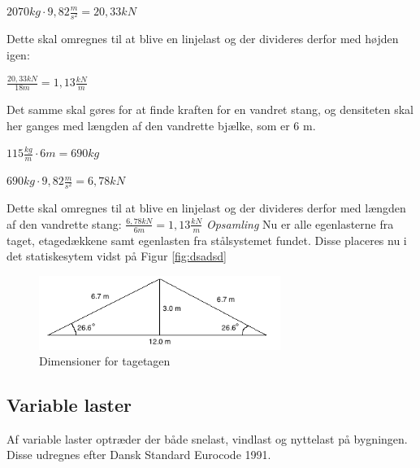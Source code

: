 \begin{center}
	$2070 kg \cdot 9,\!82\frac{m}{s^2} = 20,\! 33 kN$
\end{center}

Dette skal omregnes til at blive en linjelast og der divideres derfor med højden igen:

\begin{center}
$\frac{20,\! 33 kN}{18m} = 1,\! 13\frac{kN}{m}$
\end{center}

Det samme skal gøres for at finde kraften for en vandret stang, og densiteten skal her ganges med længden af den vandrette bjælke, som er 6 m.
\begin{center}
	$115\frac{kg}{m}\cdot 6m = 690 kg$
\end{center}

\begin{center}
	$690 kg \cdot 9,\!82\frac{m}{s^2} = 6,\!78  kN$
\end{center}

Dette skal omregnes til at blive en linjelast og der divideres derfor med længden af den vandrette stang:
$\frac{6,\! 78 kN}{6m} = 1,\! 13\frac{kN}{m}$
\newline
\newline
\textit{Opsamling}
\newline
Nu er alle egenlasterne fra taget, etagedækkene samt egenlasten fra stålsystemet fundet. Disse placeres nu i det statiskesytem vidst på Figur \ref{fig:dsadsd}

\begin{figure}[htbp]
	\centering
	\includegraphics[width=0.7\textwidth]{billeder/Tagmedvinkel.png}
	\caption{Dimensioner for tagetagen}
	\label{fig:tagetage}
\end{figure}

\subsection{Variable laster}
Af variable laster optræder der både snelast, vindlast og nyttelast på bygningen. Disse udregnes efter Dansk Standard Eurocode 1991.

